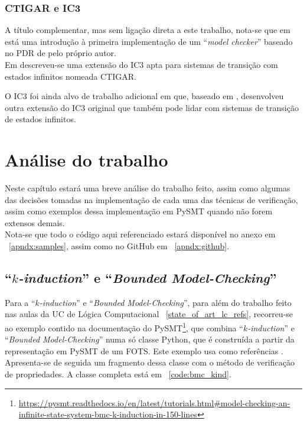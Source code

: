 \documentclass[11pt,a4paper]{report}%
\def\bmc{``\textit{Bounded Model-Checking}''\xspace}
\def\lc{Lógica Computacional\xspace}
\def\kind{``\textit{$k$-induction}''\xspace}
\begin{document}
\subsection*{CTIGAR e IC3}

A título complementar, mas sem ligação direta a este trabalho, nota-se que
em \cite{ic3} está uma introdução à primeira implementação de um ``\textit{model checker}''
baseado no PDR de \cite{pdr_original} pelo próprio autor.\\

Em \cite{ctigar} descreveu-se uma extensão do IC3 apta para sistemas de transição com estados
infinitos nomeada CTIGAR.

O IC3 foi ainda alvo de trabalho adicional em \cite{ic3_vienna} que, baseado em
\cite{ctigar}, desenvolveu outra extensão do IC3 original que também pode lidar com
sistemas de transição de estados infinitos.

\chapter{Análise do trabalho}
\label{chap:analysis}

Neste capítulo estará uma breve análise do trabalho feito, assim como algumas das
decisões tomadas na implementação de cada uma das técnicas de verificação,
assim como exemplos dessa implementação em PySMT quando não forem extensos demais.\\

Nota-se que todo o código aqui referenciado estará disponível no anexo em
~\ref{apndx:samples}, assim como no GitHub em ~\ref{apndx:github}.

\section{\kind e \bmc}
\label{analysis:kindbmc}

Para a \kind e \bmc, para além do trabalho feito nas aulas da UC de \lc
~\ref{state_of_art_lc_refs}, recorreu-se ao exemplo contido na documentação do 
PySMT\footnote{\url{https://pysmt.readthedocs.io/en/latest/tutorials.html#model-checking-an-infinite-state-system-bmc-k-induction-in-150-lines}}, que combina \kind e \bmc numa
só classe Python, que é construída a partir da representação em PySMT de um FOTS.
Este exemplo usa como referências \cite{bmc, kind_original}.\\

Apresenta-se de seguida um fragmento dessa classe com o método de verificação
de propriedades. A classe completa está em ~\ref{code:bmc_kind}.
\end{document}
